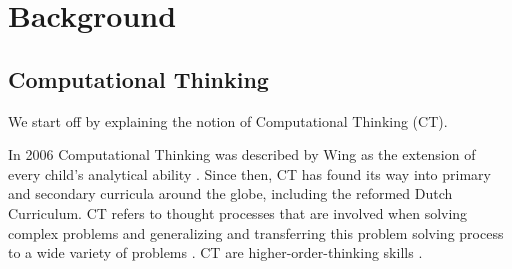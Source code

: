 \section{Background}\label{sec:background}

\subsection{Computational Thinking}\label{sec:CTdef}
We start off by explaining the notion of Computational Thinking (CT).

In 2006 Computational Thinking was described by Wing as the extension of every child's analytical ability \cite{Wing2006}. Since then, CT has found its way into primary and secondary curricula around the globe, including the reformed Dutch Curriculum. CT refers to thought processes that are involved when solving complex problems and generalizing and transferring this problem solving process to a wide variety of problems \cite{voogt2015computational}. CT are higher-order-thinking skills \cite{Yadav2017CTteacherEd}.



